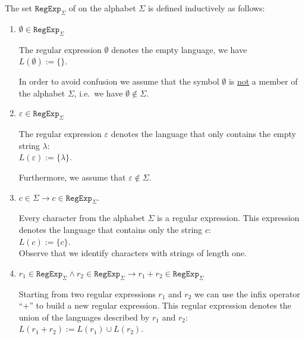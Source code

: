 \begin{Definition} 
  The set $ \texttt{RegExp}_\Sigma $ of  on the alphabet $ \Sigma $ is defined inductively as follows:
  \begin{enumerate}
  \item $\emptyset \in \texttt{RegExp}_\Sigma$ \index{$\emptyset$}

        The regular expression $\emptyset$ denotes the empty language, we have
        \\[0.2cm]
        \hspace*{1.3cm}
        $L(\emptyset) := \{\}$.

        In order to avoid confusion we assume that the symbol $\emptyset$ is \underline{not} a member of the
        alphabet $\Sigma$, i.e.~we have $\emptyset \not\in \Sigma$.
  \item $\varepsilon \in \texttt{RegExp}_\Sigma$ \index{$\varepsilon$}

        The regular expression $\varepsilon$ denotes the language that only contains the empty
        string $\lambda$: 
        \\[0.2cm]
        \hspace*{1.3cm}
        $L(\varepsilon) := \{ \lambda \}$.

        Furthermore, we assume that $\varepsilon \not\in \Sigma$.
  \item $c \in \Sigma \rightarrow c \in \texttt{RegExp}_\Sigma$.

        Every character from the alphabet $\Sigma$ is a regular expression.  This expression denotes
        the language that contains only the string $c$:
        \\[0.2cm]
        \hspace*{1.3cm}
        $L(c) := \{ c \}$.
        \\[0.2cm]
        Observe that we identify characters with strings of length one.
  \item $r_1 \in \texttt{RegExp}_\Sigma \wedge r_2 \in \texttt{RegExp}_\Sigma
         \rightarrow r_1 + r_2 \in \texttt{RegExp}_\Sigma$

        Starting from two regular expressions $r_1$ and $r_2$ we can use the  infix operator
        ``$+$'' to build a new regular expression.  This regular expression denotes the union of 
        the languages described by $r_1$ and $r_2$:
        \\[0.2cm]
        \hspace*{1.3cm}
        $L(r_1 + r_2) := L(r_1) \cup L(r_2)$.


\end{enumerate}
\end{Definition}

